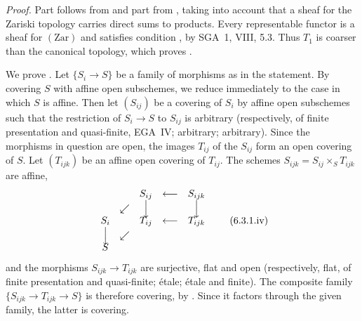 \smallskip
\noindent\textit{Proof.}
Part  follows from  and part  from , taking into account
that a sheaf for the Zariski topology carries direct sums to products.
Every representable functor is a sheaf for \((\mathrm{Zar})\) and satisfies
condition , by SGA~1, VIII, 5.3. Thus \(T_1\) is coarser than the
canonical topology, which proves .

We prove . Let \(\{S_i\to S\}\) be a family of morphisms as in the
statement. By covering \(S\) with affine open subschemes, we reduce
immediately to the case in which \(S\) is affine. Then let \((S_{ij})\) be
a covering of \(S_i\) by affine open subschemes such that the restriction of
\(S_i\to S\) to \(S_{ij}\) is arbitrary (respectively, of finite
presentation and quasi-finite, EGA~IV; arbitrary; arbitrary). Since the
morphisms in question are open, the images \(T_{ij}\) of the \(S_{ij}\) form
an open covering of \(S\). Let \((T_{ijk})\) be an affine open covering of
\(T_{ij}\). The schemes \(S_{ijk}=S_{ij}\times_ST_{ijk}\) are affine,
\[
\begin{array}{ccccc}
  & & S_{ij} & \longleftarrow & S_{ijk}\\
  & \swarrow & \Big\downarrow & & \Big\downarrow\\[-0.25em]
  S_i & & T_{ij} & \longleftarrow & T_{ijk}\\
  \Big\downarrow & \swarrow & & &\\[-0.25em]
  S & & & &
\end{array}
\tag{6.3.1.iv}\label{sga3:iv:proposition:6:3:1:eq:6:3:1:iv:01}
\]
and the morphisms \(S_{ijk}\to T_{ijk}\) are surjective, flat and open
(respectively, flat, of finite presentation and quasi-finite; \'{e}tale;
\'{e}tale and finite). The composite family
\(\{S_{ijk}\to T_{ijk}\to S\}\) is therefore covering, by . Since it
factors through the given family, the latter is covering.


